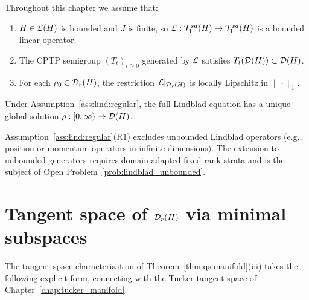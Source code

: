 \begin{assumption}
\label{ass:lind:regular}
Throughout this chapter we assume that:
\begin{enumerate}
\item[\textup{(R1)}] $H \in \mathcal{L}(H)$ is bounded and $J$ is finite,
    so $\mathcal{L}: \mathcal{T}_{1}^{sa}(H) \to \mathcal{T}_{1}^{sa}(H)$ is a bounded linear operator.
\item[\textup{(R2)}] The CPTP semigroup $(T_t)_{t \geq 0}$ generated
    by $\mathcal{L}$ satisfies $T_t(\mathcal{D}(H)) \subset \mathcal{D}(H)$.
\item[\textup{(R3)}] For each $\rho_0 \in \mathcal{D}_{r}(H)$, the restriction
    $\mathcal{L}|_{\mathcal{D}_{r}(H)}$ is locally Lipschitz in $\|\cdot\|_1$.
\end{enumerate}
\end{assumption}

Under Assumption~\ref{ass:lind:regular}, the full Lindblad equation has
a unique global solution $\rho: [0,\infty) \to \mathcal{D}(H)$.

\begin{remark}
\label{rem:lind:unbounded}
Assumption~\ref{ass:lind:regular}(R1) excludes unbounded Lindblad
operators (e.g., position or momentum operators in infinite dimensions).
The extension to unbounded generators requires domain-adapted fixed-rank
strata and is the subject of Open Problem~\ref{prob:lindblad_unbounded}.
\end{remark}

\section{Tangent space of $\mathcal{D}_{r}(H)$ via minimal subspaces}
\label{sec:lind:tangent}

The tangent space characterisation of Theorem~\ref{thm:qs:manifold}(iii)
takes the following explicit form, connecting with the Tucker tangent
space of Chapter~\ref{chap:tucker_manifold}.

